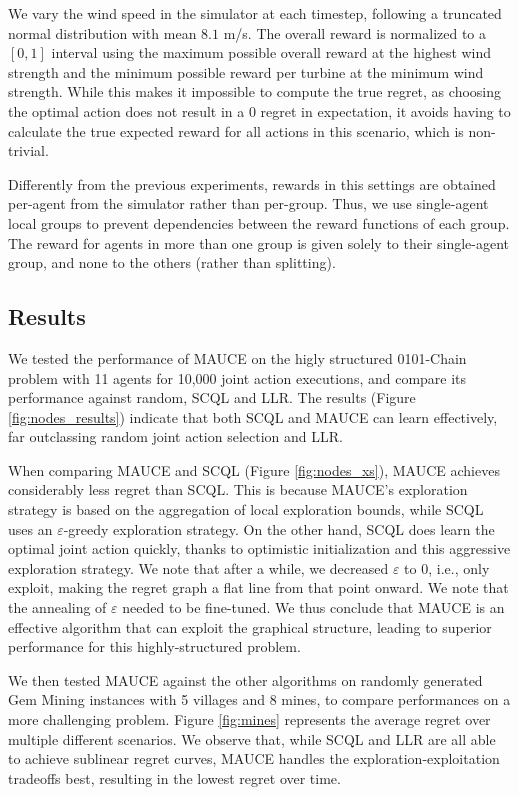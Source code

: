 We vary the wind speed in the simulator at each timestep, following a truncated normal distribution
with mean $8.1$ m/s. The overall reward is normalized to a $[0, 1]$ interval using the maximum
possible overall reward at the highest wind strength and the minimum possible reward per turbine at
the minimum wind strength. While this makes it impossible to compute the true regret, as choosing
the optimal action does not result in a $0$ regret in expectation, it avoids having to calculate the
true expected reward for all actions in this scenario, which is non-trivial.

Differently from the previous experiments, rewards in this settings are obtained per-agent from the
simulator rather than per-group. Thus, we use single-agent local groups to prevent dependencies
between the reward functions of each group. The reward for agents in more than one group is given
solely to their single-agent group, and none to the others (rather than splitting).

\subsection{Results}

We tested the performance of MAUCE on the higly structured 0101-Chain problem with 11 agents for
10,000 joint action executions, and compare its performance against random, SCQL and LLR. The
results (Figure \ref{fig:nodes_results}) indicate that both SCQL and MAUCE can learn effectively,
far outclassing random joint action selection and LLR.

When comparing MAUCE and SCQL (Figure \ref{fig:nodes_xs}), MAUCE achieves considerably less regret than SCQL. This is because MAUCE's exploration strategy is based on the aggregation of local exploration bounds, while SCQL uses an $\varepsilon$-greedy exploration strategy. On the other hand, SCQL does learn the optimal joint action quickly, thanks to optimistic initialization and this aggressive exploration strategy. We note that after a while, we decreased $\varepsilon$ to $0$, i.e., only exploit, making the regret graph a flat line from that point onward. We note that the annealing of $\varepsilon$ needed to be fine-tuned.
We thus conclude that MAUCE is an effective algorithm that can exploit the graphical structure, leading to superior performance for this highly-structured problem.

We then tested MAUCE against the other algorithms on randomly generated Gem Mining instances with 5
villages and 8 mines, to compare performances on a more challenging problem. Figure \ref{fig:mines}
represents the average regret over multiple different scenarios. We observe that, while SCQL and LLR
are all able to achieve sublinear regret curves, MAUCE handles the exploration-exploitation
tradeoffs best, resulting in the lowest regret over time.

